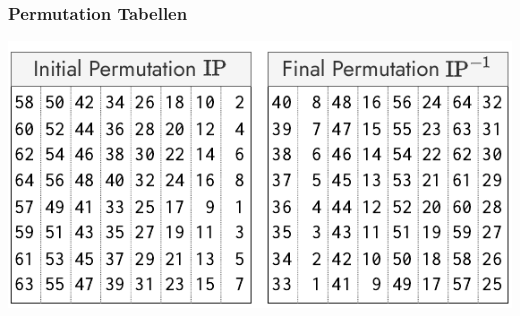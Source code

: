 \documentclass[
  10pt,
  a4paper,
  twocolumn]{article}
\begin{document}
\subsubsection{Permutation Tabellen}\label{permutation-tabellen}

\begin{center}
\includegraphics{images/crypto/permutation tables.pdf}
\end{center}
\end{document}
